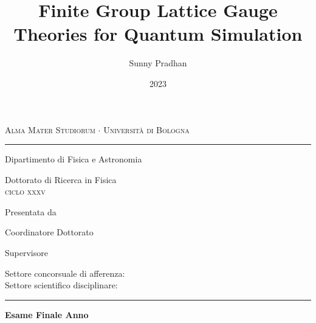 
\title{Finite Group Lattice Gauge Theories for Quantum Simulation}
\author{Sunny Pradhan}
\date{2023}
\cosupervisor{}

\begin{titlingpage}
    \setlength{\parindent}{0pt}
    \begin{center}
        \textsc{\Large Alma Mater Studiorum $\cdot$ Universit\`a di Bologna}
        \rule[0.5ex]{\linewidth}{2pt}
        Dipartimento di Fisica e Astronomia

        \vspace*{25pt}
        {\LARGE Dottorato di Ricerca in Fisica}\\[2pt]
        \textsc{ciclo xxxv}
    \end{center}

    \vspace{1.5cm}

    \begin{center}
        \Huge\thetitle
    \end{center}

    \vspace{3cm}

    \large
    \linespread{1.2}
    Presentata da\\
    \textbf{\theauthor}

    \vspace{1.2cm}

    \begin{minipage}[t]{0.47\textwidth}\large
        Coordinatore Dottorato\\
        \textbf{\thephdcoordinator}
    \end{minipage}
    \hfill
    \begin{minipage}[t]{0.47\textwidth}\raggedleft\large
        Supervisore\\
        \textbf{\thesupervisor}

    \end{minipage}

    \vfill
    \normalsize

    Settore concorsuale di afferenza: \ilsettoreconcorsuale \\
    Settore scientifico disciplinare: \ilsettoredisciplinare

    \rule[0.5ex]{\textwidth}{1pt}

    \vspace*{-10pt}
    \begin{center}
        \textbf{Esame Finale Anno \thedate}
    \end{center}
\end{titlingpage}
